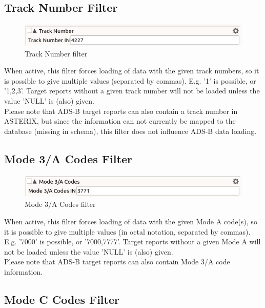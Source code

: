 \subsection{Track Number Filter}

\begin{figure}[H]
  \center
    \includegraphics[width=12cm,frame]{figures/filter_tracknum.png}
  \caption{Track Number filter}
\end{figure}

When active, this filter forces loading of data with the given track numbers, so it is possible to give multiple values (separated by commas). E.g. '1' is possible, or '1,2,3'. Target reports without a given track number will not be loaded unless the value 'NULL' is (also) given. \\

Please note that ADS-B target reports can also contain a track number in ASTERIX, but since the information can not currently be mapped to the database (missing in schema), this filter does not influence ADS-B data loading.

\subsection{Mode 3/A Codes Filter}

\begin{figure}[H]
  \center
    \includegraphics[width=12cm,frame]{figures/filter_mode3a.png}
  \caption{Mode 3/A Codes filter}
\end{figure}

When active, this filter forces loading of data with the given Mode A code(s), so it is possible to give multiple values (in octal notation, separated by commas). E.g. '7000' is possible, or '7000,7777'. Target reports without a given Mode A will not be loaded unless the value 'NULL' is (also) given. \\

Please note that ADS-B target reports can also contain Mode 3/A code information.

\subsection{Mode C Codes Filter}

